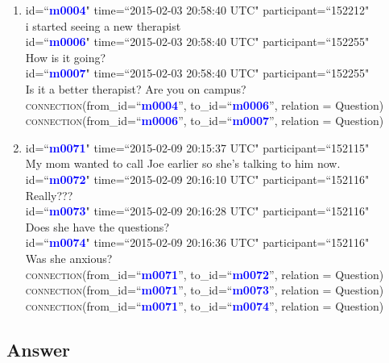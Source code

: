 \documentclass{article}
\begin{document}
\begin{enumerate}[resume]
\item id=``\textbf{\textcolor{blue}{m0004}}" time=``2015-02-03 20:58:40 UTC" participant=``152212"\\
i started seeing a new therapist\\
id=``\textbf{\textcolor{blue}{m0006}}" time=``2015-02-03 20:58:40 UTC" participant=``152255"\\
How is it going?\\
id=``\textbf{\textcolor{blue}{m0007}}" time=``2015-02-03 20:58:40 UTC" participant=``152255"\\
Is it a better therapist? Are you on campus? \\
\textsc{connection}(from\_id=``\textbf{\textcolor{blue}{m0004}}'', to\_id=``\textbf{\textcolor{blue}{m0006}}'', relation = Question)\\
\textsc{connection}(from\_id=``\textbf{\textcolor{blue}{m0006}}'', to\_id=``\textbf{\textcolor{blue}{m0007}}'', relation = Question)\\
\item id=``\textbf{\textcolor{blue}{m0071}}" time=``2015-02-09 20:15:37 UTC" participant=``152115"\\
My mom wanted to call Joe earlier so she's talking to him now.\\
id=``\textbf{\textcolor{blue}{m0072}}" time=``2015-02-09 20:16:10 UTC" participant=``152116"\\
Really???\\
id=``\textbf{\textcolor{blue}{m0073}}" time=``2015-02-09 20:16:28 UTC" participant=``152116"\\
Does she have the questions?\\
id=``\textbf{\textcolor{blue}{m0074}}" time=``2015-02-09 20:16:36 UTC" participant=``152116"\\
Was she anxious?\\
\textsc{connection}(from\_id=``\textbf{\textcolor{blue}{m0071}}'', to\_id=``\textbf{\textcolor{blue}{m0072}}'', relation = Question)\\
\textsc{connection}(from\_id=``\textbf{\textcolor{blue}{m0071}}'', to\_id=``\textbf{\textcolor{blue}{m0073}}'', relation = Question)\\
\textsc{connection}(from\_id=``\textbf{\textcolor{blue}{m0071}}'', to\_id=``\textbf{\textcolor{blue}{m0074}}'', relation = Question)\\
\end{enumerate}

\subsection{Answer}
\end{document}
